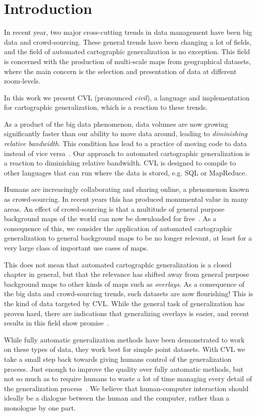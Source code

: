 \section{Introduction}
In recent year, two major cross-cutting trends in data management have been  big data and crowd-sourcing. These general trends have been changing a lot of fields, and the field of automated cartographic generalization is no exception. This field is concerned with the production of multi-scale maps from geographical datasets, where the main concern is the selection and presentation of data at different zoom-levels.

In this work we present CVL (pronounced \emph{civil}), a language and implementation for cartographic generalization, which is a reaction to these trends.

As a product of the big data phenomenon, data volumes are now growing significantly faster than our ability to move data around, leading to \emph{diminishing relative bandwidth}. This condition has lead to a practice of moving code to data~\cite{mapreduce} instead of vice versa~\cite{fusiontables}. Our approach to automated cartographic generalization is a reaction to diminishing relative bandwidth. CVL is designed to compile to other languages that can run where the data is stored, e.g. SQL or MapReduce.

Humans are increasingly collaborating and sharing online, a phenomenon known as crowd-sourcing. In recent years this has produced monumental value in many areas. An effect of crowd-sourcing is that a multitude of general purpose background maps of the world can now be downloaded for free~\cite{openstreetmap,googlemaps,bingmaps}. As a consequence of this, we consider the application of automated cartographic generalization to general background maps to be no longer relevant, at least for a very large class of important use cases of maps.

This does not mean that automated cartographic generalization is a closed chapter in general, but that the relevance has shifted away from general purpose background maps to other kinds of maps such as \emph{overlays}. As a consequence of the big data and crowd-sourcing trends, such datasets are now flourishing! This is the kind of data targeted by CVL. While the general task of generalization has proven hard, there are indications that generalizing overlays is easier, and recent results in this field show promise~\cite{fusiontables,thatotherpaper}. 

While fully automatic generalization methods have been demonstrated to work on these types of data, they work best for simple point datasets. With CVL we take a small step back towards giving humans control of the generalization process. Just enough to improve the quality over fully automatic methods, but not so much as to require humans to waste a lot of time managing every detail of the generalization process~\cite{fme}. We believe that human-computer interaction should ideally be a dialogue between the human and the computer, rather than a monologue by one part.

